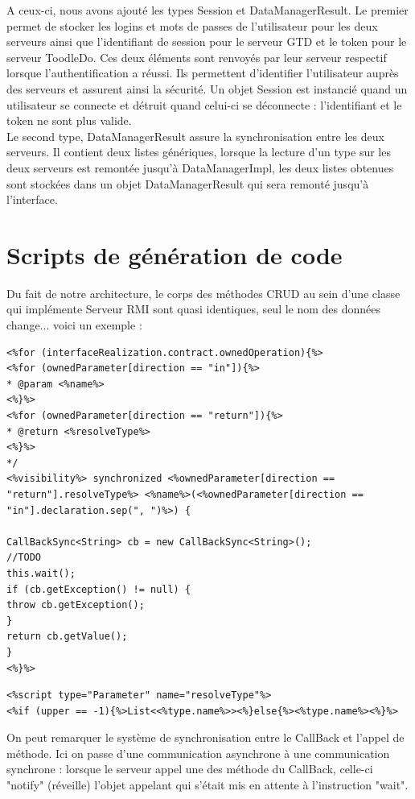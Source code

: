 A ceux-ci, nous avons ajouté les types Session et DataManagerResult. Le premier permet de stocker les logins et mots de passes de l'utilisateur pour les deux serveurs ainsi que l'identifiant de session pour le serveur GTD et le token pour le serveur ToodleDo. Ces deux éléments sont renvoyés par leur serveur respectif lorsque l'authentification a réussi. Ils permettent d'identifier l'utilisateur auprès des serveurs et assurent ainsi la sécurité. Un objet Session est instancié quand un utilisateur se connecte et détruit quand celui-ci se déconnecte : l'identifiant et le token ne sont plus valide.\\
Le second type, DataManagerResult assure la synchronisation entre les deux serveurs. Il contient deux listes génériques, lorsque la lecture d'un type sur les deux serveurs est remontée jusqu'à DataManagerImpl, les deux listes obtenues sont stockées dans un objet DataManagerResult qui sera remonté jusqu'à l'interface.


\chapter{Scripts de génération de code}

    Du fait de notre architecture, le corps des méthodes CRUD au sein d'une classe qui implémente Serveur RMI sont quasi identiques, seul le nom des données change... voici un exemple :

\begin{verbatim}
<%for (interfaceRealization.contract.ownedOperation){%>
<%for (ownedParameter[direction == "in"]){%>
* @param <%name%>
<%}%>
<%for (ownedParameter[direction == "return"]){%>
* @return <%resolveType%>
<%}%>
*/
<%visibility%> synchronized <%ownedParameter[direction == "return"].resolveType%> <%name%>(<%ownedParameter[direction == "in"].declaration.sep(", ")%>) {

CallBackSync<String> cb = new CallBackSync<String>();
//TODO
this.wait();
if (cb.getException() != null) {
throw cb.getException();
}
return cb.getValue();
}
<%}%>
\end{verbatim}

\begin{verbatim}
<%script type="Parameter" name="resolveType"%>
<%if (upper == -1){%>List<<%type.name%>><%}else{%><%type.name%><%}%>
\end{verbatim}

On peut remarquer le système de synchronisation entre le CallBack et l'appel de méthode. Ici on passe d'une communication asynchrone à une communication synchrone : lorsque le serveur appel une des méthode du CallBack, celle-ci "notify" (réveille) l'objet appelant qui s'était mis en attente à l'instruction "wait".

